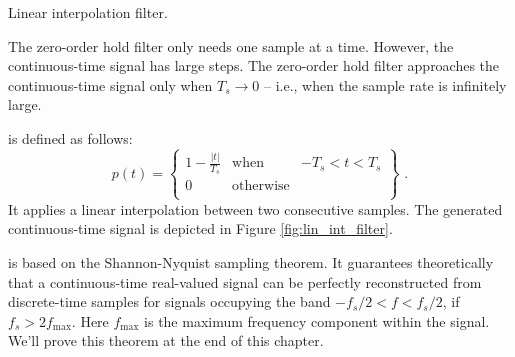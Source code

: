 \begin{marginfigure}
\begin{center}
\end{center}
\caption{Linear interpolation filter.}
\label{fig:lin_int_filter}
\end{marginfigure}

The zero-order hold filter only needs one sample at a time. However, the continuous-time signal has large steps. 
The zero-order hold filter approaches the continuous-time signal only when $T_s\rightarrow 0$ -- i.e., when the sample rate is infinitely large.

 is defined as follows:
\begin{equation}
p(t) = \left\{
  \begin{array}{rcr}
    1-\frac{|t|}{T_s} & \mathrm{when} & -T_s < t < T_s \\
    0 & \mathrm{otherwise} & \\
  \end{array}
\right\} \,\,.
\end{equation}
It applies a linear interpolation between two consecutive samples. The generated continuous-time signal is depicted in Figure \ref{fig:lin_int_filter}.

 is based on the
Shannon-Nyquist sampling theorem. It guarantees theoretically that a continuous-time real-valued signal can be perfectly reconstructed from discrete-time samples for 
signals occupying the band $-f_s/2 < f < f_s/2$, if $f_s > 2f_{\mathrm{max}}$. 
Here $f_{\mathrm{max}}$ is the maximum frequency component within the signal. We'll prove this theorem at the end of this chapter.


